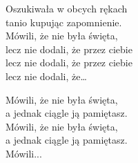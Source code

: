 \begin{text}
\begin{tinyTwelve}
    \hfill\break
    Oszukiwała w obcych rękach\\
    tanio kupując zapomnienie.\\
    Mówili, że nie była święta,\\
    lecz nie dodali, że przez ciebie\\
    lecz nie dodali, że przez ciebie\\
    lecz nie dodali, że…

    \hfill\break
    \vin Mówili, że nie była święta,\\
    \vin a jednak ciągle ją pamiętasz.\\
    \vin Mówili, że nie była święta,\\
    \vin a jednak ciągle ją pamiętasz.\\
    \vin Mówili...
\end{tinyTwelve}
\end{text}
